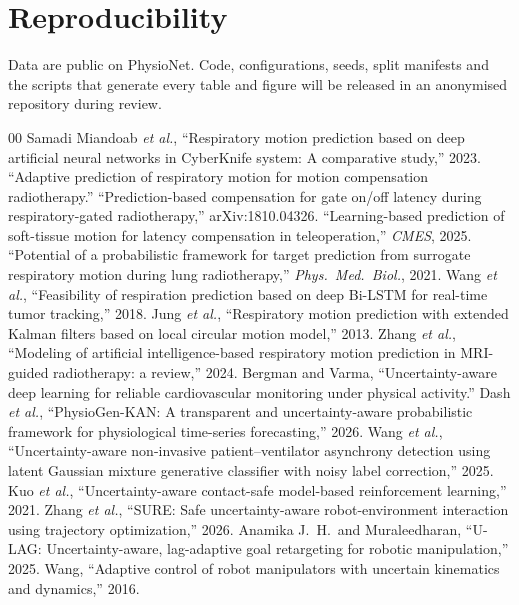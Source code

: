 \documentclass[conference]{IEEEtran}
\begin{document}
\section*{Reproducibility}
Data are public on PhysioNet. Code, configurations, seeds, split manifests and the scripts that generate every table and figure will be released in an anonymised repository during review.

{\footnotesize
\begin{thebibliography}{00}
 Samadi Miandoab \emph{et al.}, ``Respiratory motion prediction based on deep artificial neural networks in CyberKnife system: A comparative study,'' 2023.
 ``Adaptive prediction of respiratory motion for motion compensation radiotherapy.''
 ``Prediction-based compensation for gate on/off latency during respiratory-gated radiotherapy,'' arXiv:1810.04326.
 ``Learning-based prediction of soft-tissue motion for latency compensation in teleoperation,'' \emph{CMES}, 2025.
 ``Potential of a probabilistic framework for target prediction from surrogate respiratory motion during lung radiotherapy,'' \emph{Phys.\ Med.\ Biol.}, 2021.
 Wang \emph{et al.}, ``Feasibility of respiration prediction based on deep Bi-LSTM for real-time tumor tracking,'' 2018.
 Jung \emph{et al.}, ``Respiratory motion prediction with extended Kalman filters based on local circular motion model,'' 2013.
 Zhang \emph{et al.}, ``Modeling of artificial intelligence-based respiratory motion prediction in MRI-guided radiotherapy: a review,'' 2024.
 Bergman and Varma, ``Uncertainty-aware deep learning for reliable cardiovascular monitoring under physical activity.''
 Dash \emph{et al.}, ``PhysioGen-KAN: A transparent and uncertainty-aware probabilistic framework for physiological time-series forecasting,'' 2026.
 Wang \emph{et al.}, ``Uncertainty-aware non-invasive patient--ventilator asynchrony detection using latent Gaussian mixture generative classifier with noisy label correction,'' 2025.
 Kuo \emph{et al.}, ``Uncertainty-aware contact-safe model-based reinforcement learning,'' 2021.
 Zhang \emph{et al.}, ``SURE: Safe uncertainty-aware robot-environment interaction using trajectory optimization,'' 2026.
 Anamika J.\ H.\ and Muraleedharan, ``U-LAG: Uncertainty-aware, lag-adaptive goal retargeting for robotic manipulation,'' 2025.
 Wang, ``Adaptive control of robot manipulators with uncertain kinematics and dynamics,'' 2016.

\end{thebibliography}}
\end{document}
